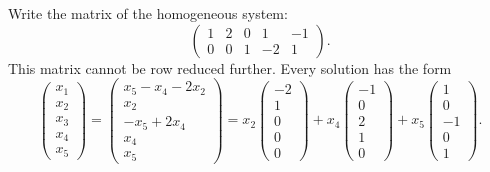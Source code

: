 \documentclass{article}
\begin{document}
\begin{exercise}
\begin{solution}
\soln Write the matrix of the homogeneous system:
\[
\left(\begin{array}{rrrrr} 1 & 2 & 0 & 1 & -1 \\
0 & 0 & 1 & -2 & 1 \end{array}\right).
\]
This matrix cannot be row reduced further.  Every solution has the form
\[
\left(\begin{array}{r} x_1 \\ x_2 \\ x_3 \\ x_4 \\ x_5
\end{array}\right) = \left(\begin{array}{c} x_5 - x_4 - 2x_2 \\
x_2 \\ -x_5 + 2x_4 \\ x_4 \\ x_5 \end{array}\right) = 
x_2\left(\begin{array}{r} -2 \\ 1 \\ 0 \\ 0 \\ 0
\end{array}\right) + x_4\left(\begin{array}{r} -1 \\ 0 \\ 2 \\
1 \\ 0 \end{array}\right) + x_5\left(\begin{array}{r} 1 \\ 0 \\
-1 \\ 0 \\ 1 \end{array}\right).
\]

\end{solution}
\end{exercise}




\newpage

\problemlabel
\end{document}
